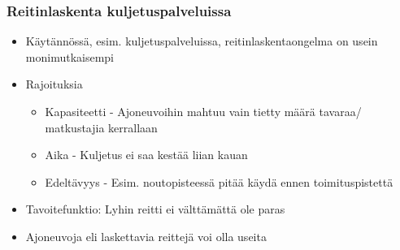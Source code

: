 \documentclass{beamer}
\begin{document}
\begin{frame}
    \frametitle{Reitinlaskenta kuljetuspalveluissa}
    \begin{itemize}
    \item
    Käytännössä, esim. kuljetuspalveluissa, reitinlaskentaongelma on usein monimutkaisempi
    \item
    Rajoituksia
    \begin{itemize}
\item 
Kapasiteetti - Ajoneuvoihin mahtuu vain tietty määrä tavaraa/ matkustajia kerrallaan
\item
Aika - Kuljetus ei saa kestää liian kauan
\item
Edeltävyys - Esim. noutopisteessä pitää käydä ennen toimituspistettä
\end{itemize}
\item
Tavoitefunktio: Lyhin reitti ei välttämättä ole paras
\item
Ajoneuvoja eli laskettavia reittejä voi olla useita
  \end{itemize}

\end{frame}
\end{document}
